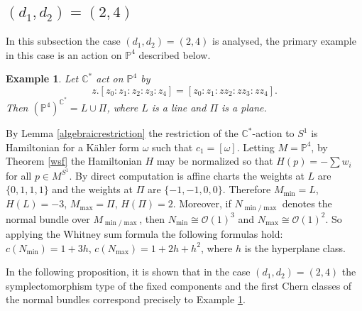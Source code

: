 \documentclass[12pt]{article}
\newtheorem{example}[theorem]{Example}
\begin{document}
\subsection{ $(d_1,d_2) = (2,4)$}

In this subsection the case $(d_1,d_2)=(2,4)$ is analysed, the primary example in this case is an action on $\mathbb{P}^4$ described below.

\begin{example} \label{exampletwofour}
Let $\mathbb{C}^*$ act on $\mathbb{P}^4$ by $$z.[z_0:z_1: z_2: z_3  :z_4] = [z_0: z_1:zz_2:zz_3:zz_4] .$$ Then $(\mathbb{P}^4)^{\mathbb{C}^*} = L \cup \Pi$, where $L$ is a line and $\Pi$ is a plane.
\end{example}
By Lemma  \ref{algebraicrestriction} the restriction of the $\mathbb{C}^*$-action to $S^1$ is Hamiltonian for a K\"{a}hler form $\omega$ such that $c_1 = [\omega]$. Letting $M=\mathbb{P}^4$, by Theorem \ref{wsf} the Hamiltonian $H$ may be normalized so that $H(p) =- \sum w_i$ for all $p \in M^{S^1}$.  By direct computation is affine charts the weights at $L$ are $\{0,1,1,1\}$ and the weights at $\Pi$ are $\{-1,-1,0,0\}$. Therefore $M_{\min}=L$, $H(L)=-3$, $M_{\max}=\Pi$, $H(\Pi)=2$. Moreover, if $N_{\min/\max}$ denotes the normal bundle over $M_{\min/\max}$, then $N_{\min} \cong  \mathcal{O}(1)^3$ and $N_{\max} \cong \mathcal{O}(1)^2$. So applying the Whitney sum formula the following formulas hold: $c(N_{\min}) = 1 + 3h$, $c(N_{\max}) = 1 + 2h + h^2$, where $h$ is the hyperplane class. 


In the following proposition, it is shown that in the case $(d_1,d_2)  =(2,4)$ the symplectomorphism type of the fixed components and the first Chern classes of the normal bundles correspond precisely to Example \ref{exampletwofour}.
\end{document}
